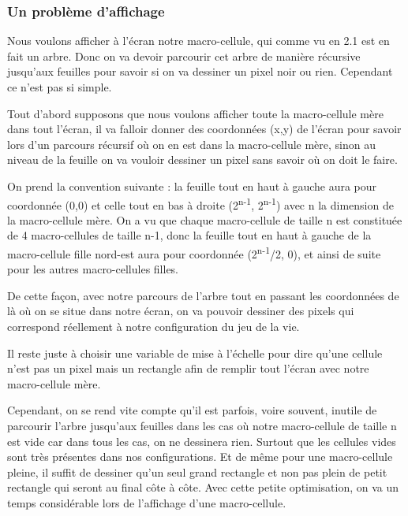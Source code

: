 \documentclass[a4paper,12pt]{report}
\begin{document}
\subsubsection*{Un problème d'affichage}

Nous voulons afficher à l'écran notre macro-cellule, qui comme vu en
2.1 est en fait un arbre. Donc on va devoir parcourir cet arbre de
manière récursive jusqu'aux feuilles pour savoir si on va dessiner un
pixel noir ou rien. Cependant ce n'est pas si simple.

\medskip

Tout d'abord supposons que nous voulons afficher toute la
macro-cellule mère dans tout l'écran, il va falloir donner des
coordonnées (x,y) de l'écran pour savoir lors d'un parcours récursif
où on en est dans la macro-cellule mère, sinon au niveau de la feuille
on va vouloir dessiner un pixel sans savoir où on doit le faire.

On prend la convention suivante : la feuille tout en haut à gauche
aura pour coordonnée (0,0) et celle tout en bas à droite
(2\textsuperscript{n-1}, 2\textsuperscript{n-1}) avec n la dimension
de la macro-cellule mère. On a vu que chaque macro-cellule de taille n
est constituée de 4 macro-cellules de taille n-1, donc la feuille tout
en haut à gauche de la macro-cellule fille nord-est aura pour
coordonnée (2\textsuperscript{n-1}/2, 0), et ainsi de suite pour les
autres macro-cellules filles.

De cette façon, avec notre parcours de l'arbre tout en passant les
coordonnées de là où on se situe dans notre écran, on va pouvoir
dessiner des pixels qui correspond réellement à notre configuration du
jeu de la vie.

Il reste juste à choisir une variable de mise à l'échelle pour dire
qu'une cellule n'est pas un pixel mais un rectangle afin de remplir
tout l'écran avec notre macro-cellule mère.

\medskip

Cependant, on se rend vite compte qu'il est parfois, voire souvent,
inutile de parcourir l'arbre jusqu'aux feuilles dans les cas où notre
macro-cellule de taille n est vide car dans tous les cas, on ne
dessinera rien. Surtout que les cellules vides sont très présentes
dans nos configurations. Et de même pour une macro-cellule pleine, il
suffit de dessiner qu'un seul grand rectangle et non pas plein de
petit rectangle qui seront au final côte à côte.  Avec cette petite
optimisation, on va un temps considérable lors de l'affichage d'une
macro-cellule.
\end{document}
